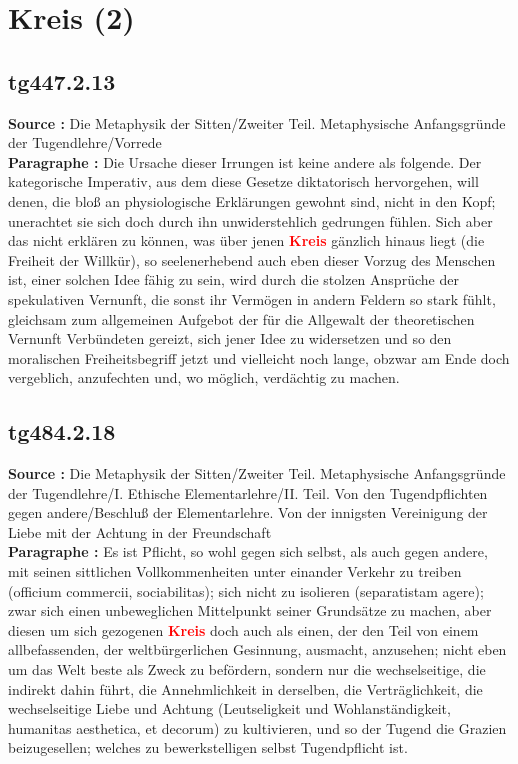 \documentclass[a4paper,12pt,twoside]{book}
\newcommand{\match}[1]{\textcolor{red}{\textbf{#1}}}
\newcommand{\unnumberedsection}[1]{
	\section*{#1}
	\addcontentsline{toc}{section}{#1}
	\markright{#1}
}
\begin{document}
	\unnumberedsection{Kreis (2)} 
	\subsection*{tg447.2.13} 
	\textbf{Source : }Die Metaphysik der Sitten/Zweiter Teil. Metaphysische Anfangsgründe der Tugendlehre/Vorrede\\  
	
	\textbf{Paragraphe : }
	Die Ursache dieser Irrungen ist keine andere als folgende. Der kategorische Imperativ, aus dem diese Gesetze diktatorisch hervorgehen, will denen, die bloß an physiologische Erklärungen gewohnt sind, nicht in den Kopf; unerachtet sie sich doch durch ihn unwiderstehlich gedrungen fühlen. Sich aber das nicht erklären zu können, was über jenen \match{Kreis} gänzlich hinaus liegt (die Freiheit der Willkür), so seelenerhebend auch eben dieser Vorzug des Menschen ist, einer solchen Idee fähig zu sein, wird durch die stolzen Ansprüche der spekulativen Vernunft, die sonst ihr Vermögen in andern Feldern so stark fühlt, gleichsam zum allgemeinen Aufgebot der für die Allgewalt der theoretischen Vernunft Verbündeten gereizt, sich jener Idee zu widersetzen und so den moralischen Freiheitsbegriff jetzt und vielleicht noch lange, obzwar am Ende doch vergeblich, anzufechten und, wo möglich, verdächtig zu machen. 
	
	\subsection*{tg484.2.18} 
	\textbf{Source : }Die Metaphysik der Sitten/Zweiter Teil. Metaphysische Anfangsgründe der Tugendlehre/I. Ethische Elementarlehre/II. Teil. Von den Tugendpflichten gegen andere/Beschluß der Elementarlehre. Von der innigsten Vereinigung der Liebe mit der Achtung in der Freundschaft\\  
	
	\textbf{Paragraphe : }Es ist Pflicht, so wohl gegen sich selbst, als auch gegen andere, mit seinen sittlichen Vollkommenheiten unter einander Verkehr zu treiben (officium commercii, sociabilitas); sich nicht zu isolieren (separatistam agere); zwar sich einen unbeweglichen Mittelpunkt seiner Grundsätze zu machen, aber diesen um sich gezogenen \match{Kreis} doch auch als einen, der den Teil von einem allbefassenden, der weltbürgerlichen Gesinnung, ausmacht, anzusehen; nicht eben um das Welt beste als Zweck zu befördern, sondern nur die wechselseitige, die indirekt dahin führt, die Annehmlichkeit in derselben, die Verträglichkeit, die wechselseitige Liebe und Achtung (Leutseligkeit und Wohlanständigkeit, humanitas aesthetica, et decorum) zu kultivieren, und so der Tugend die Grazien beizugesellen; welches zu bewerkstelligen selbst Tugendpflicht ist. 
	
\end{document}

